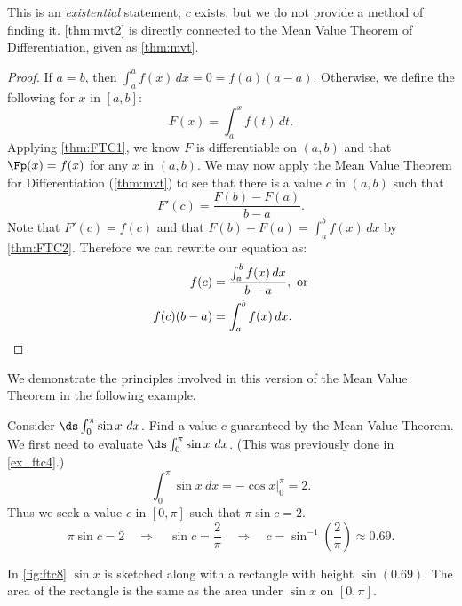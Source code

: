 This is an \emph{existential} statement; $c$ exists, but we do not provide a method of finding it. \autoref{thm:mvt2} is directly connected to the Mean Value Theorem of Differentiation, given %
as \autoref{thm:mvt}. %

\begin{proof}
If $a=b$, then $\int_a^a f(x)\,dx =0=f(a)(a-a)$. Otherwise, we define the following for $x$ in $[a,b]$:
\[ F(x)=\int_a^x f(t)\,dt.\]
Applying \autoref{thm:FTC1}, we know $F$ is differentiable on $(a,b)$ and that $\Fp(x)=f(x)$ for any $x$ in $(a,b)$. We may now apply the Mean Value Theorem for Differentiation (\autoref{thm:mvt}) to see that there is a value $c$ in $(a,b)$ such that
\[F'(c)=\frac{F(b)-F(a)}{b-a}.\]
Note that $F'(c)=f(c)$ and that $F(b)-F(a)=\int_a^b f(x)\,dx$ by \autoref{thm:FTC2}. Therefore we can rewrite our equation as: 
\begin{align*}
f(c)&=\frac{\int_a^b f(x)\,dx}{b-a},\text{ or}\\
f(c)(b-a)&=\int_a^b f(x)\,dx.\qedhere
\end{align*}
\end{proof}

We demonstrate the principles involved in this version of the Mean Value Theorem in the following example.


\begin{example}\label{ex_ftc8}
Consider $\ds\int_0^\pi \sin x\ dx$. Find a value $c$ guaranteed by the Mean Value Theorem.
\solution
We first need to evaluate $\ds\int_0^\pi \sin x\ dx$. (This was previously done in \autoref{ex_ftc4}.)
\[\int_0^\pi\sin x\ dx = -\cos x \Big|_0^\pi = 2.\]
Thus we seek a value $c$ in $[0,\pi]$ such that $\pi\sin c =2$. 
\[
 \pi\sin c = 2\quad \Rightarrow\quad
 \sin c =\frac2\pi\quad \Rightarrow\quad
 c = \sin^{-1}\left(\frac2\pi\right) \approx 0.69.
\]

In \autoref{fig:ftc8} $\sin x$ is sketched along with a rectangle with height $\sin (0.69)$. The area of the rectangle is the same as the area under $\sin x$ on $[0,\pi]$.
\end{example}

